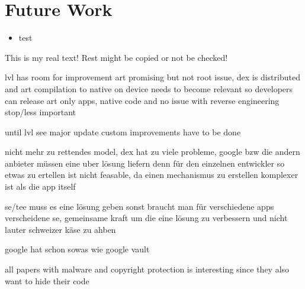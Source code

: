 \section{Future Work}\label{section:conclusion-future}
\begin{itemize}
    \item test
\end{itemize}
This is my real text! Rest might be copied or not be checked!


%
lvl has room for improvement
art promising but not root issue, dex is distributed and art compilation to native on device
needs to become relevant so developers can release art only apps, native code and no issue with reverse engineering stop/less important

until lvl see major update custom improvements have to be done
\cite{munteanLicense}
%

nicht mehr zu rettendes model, dex hat zu viele probleme, google bzw die andern anbieter müssen eine uber lösung liefern denn für den einzelnen entwickler so etwas zu ertellen ist nicht feasable, da einen mechanismus zu erstellen komplexer ist als die app itself

se/tee muss es eine lösung geben sonst braucht man für verschiedene apps verscheidene se, gemeinsame kraft um die eine lösung zu verbessern und nicht lauter schweizer käse zu ahben

google hat schon sowas wie google vault

all papers with malware and copyright protection is interesting since they also want to hide their code
